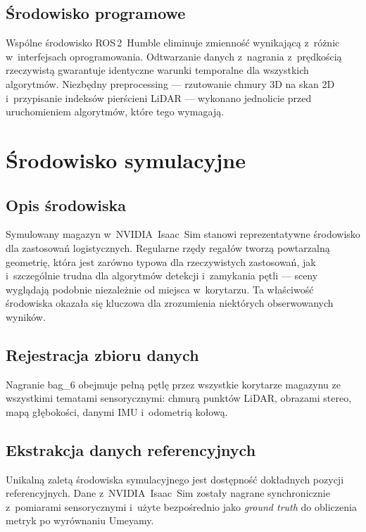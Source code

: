 \subsection{Środowisko programowe}

Wspólne środowisko ROS\,2~Humble eliminuje zmienność wynikającą z~różnic
w~interfejsach oprogramowania.
Odtwarzanie danych z~nagrania z~prędkością rzeczywistą gwarantuje identyczne
warunki temporalne dla wszystkich algorytmów.
Niezbędny preprocessing --- rzutowanie chmury 3D na skan 2D
i~przypisanie indeksów pierścieni LiDAR --- wykonano jednolicie przed
uruchomieniem algorytmów, które tego wymagają.

\section{Środowisko symulacyjne}

\subsection{Opis środowiska}

Symulowany magazyn w~NVIDIA~Isaac~Sim stanowi reprezentatywne środowisko
dla zastosowań logistycznych.
Regularne rzędy regałów tworzą powtarzalną geometrię, która jest zarówno
typowa dla rzeczywistych zastosowań, jak i~szczególnie trudna dla algorytmów
detekcji i~zamykania pętli --- sceny wyglądają podobnie niezależnie od miejsca
w~korytarzu.
Ta właściwość środowiska okazała się kluczowa dla zrozumienia niektórych
obserwowanych wyników.

\subsection{Rejestracja zbioru danych}

Nagranie bag\_6 obejmuje pełną pętlę przez wszystkie korytarze magazynu
ze wszystkimi tematami sensorycznymi: chmurą punktów LiDAR, obrazami stereo,
mapą głębokości, danymi IMU i~odometrią kołową.

\subsection{Ekstrakcja danych referencyjnych}

Unikalną zaletą środowiska symulacyjnego jest dostępność dokładnych
pozycji referencyjnych.
Dane z~NVIDIA~Isaac~Sim zostały nagrane synchronicznie z~pomiarami sensorycznymi
i~użyte bezpośrednio jako \textit{ground truth} do obliczenia metryk po
wyrównaniu Umeyamy.

